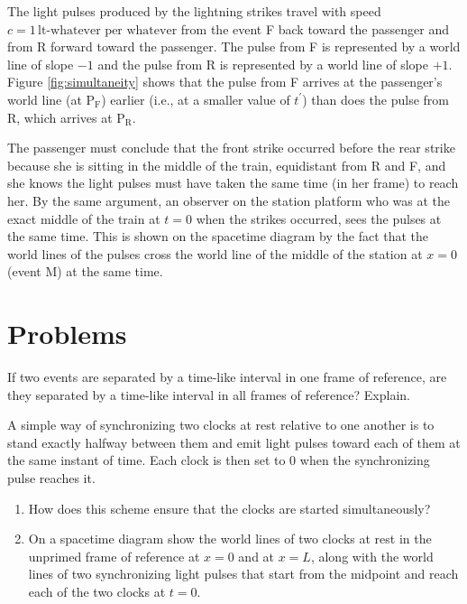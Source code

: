 \begin{example}
The light pulses produced by the lightning strikes travel with speed
$c = 1\,\text{lt-whatever per whatever}$ from the event F back toward
the passenger and from R forward toward the passenger.  The pulse from
F is represented by a world line of slope $-1$ and the pulse from R is
represented by a world line of slope $+1$.  Figure
\ref{fig:simultaneity} shows that the pulse from F arrives at the
passenger's world line (at P$_\text{F}$) earlier (i.e., at a smaller
value of $t^\prime$) than does the pulse from R, which arrives at
P$_\text{R}$.

The passenger must conclude that the front strike occurred before 
the rear strike because she is sitting in the middle of the train, 
equidistant from R and F, and she knows the light pulses must have 
taken the same time (in her frame) to reach her.  By the same 
argument, an observer on the station platform who was at the exact 
middle of the train at $t = 0$ when the strikes occurred, sees the 
pulses at the same time.  This is shown on the spacetime diagram 
by the fact that the world lines of the pulses cross the world line of 
the middle of the station at $x = 0$ (event M) at the same time.
\label{example:simultaneity}
\end{example}



\section*{Problems}

\begin{exercise}
If two events are separated by a time-like interval in one
frame of reference, are they separated by a time-like interval in all
frames of reference?  Explain.
\end{exercise}

\begin{exercise}
A simple way of synchronizing two clocks at rest relative to one
another is to stand exactly halfway between them and emit light pulses
toward each of them at the same instant of time.  Each clock is then
set to 0 when the synchronizing pulse reaches it.
  \begin{enumerate}
  \item How does this scheme ensure that the clocks are started
    simultaneously?  
  \item On a spacetime diagram show the world lines of two
    clocks at rest in the unprimed frame of reference at $x = 0$ and at $x =
    L$, along with the world lines of two synchronizing light pulses that
    start from the midpoint and reach each of the two clocks at $t = 0.$
  \end{enumerate}
\label{prob:synchronizeB}
\end{exercise}

